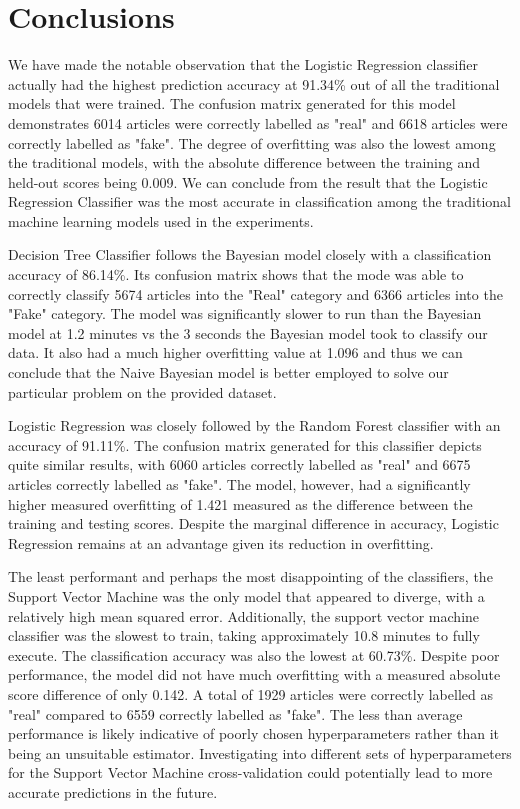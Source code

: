 \documentclass[10pt,twocolumn,letterpaper]{article}
\begin{document}
\section{Conclusions}
\small
We have made the notable observation that the Logistic Regression classifier actually had the highest prediction accuracy at 91.34\% out of all the traditional models that were trained. The confusion matrix generated for this model demonstrates 6014 articles were correctly labelled as "real" and 6618 articles were correctly labelled as "fake". The degree of overfitting was also the lowest among the traditional models, with the absolute difference between the training and held-out scores being 0.009. We can conclude from the result that the Logistic Regression Classifier was the most accurate in classification among the traditional machine learning models used in the experiments. \par

Decision Tree Classifier follows the Bayesian model closely with a classification accuracy of 86.14\%. Its confusion matrix shows that the mode was able to correctly classify 5674 articles into the "Real" category and 6366 articles into the "Fake" category. The model was significantly slower to run than the Bayesian model at 1.2 minutes vs the 3 seconds the Bayesian model took to classify our data. It also had a much higher overfitting value at 1.096 and thus we can conclude that the Naive Bayesian model is better employed to solve our particular problem on the provided dataset.  \par

Logistic Regression was closely followed by the Random Forest classifier with an accuracy of 91.11\%. The confusion matrix generated for this classifier depicts quite similar results, with 6060 articles correctly labelled as "real" and 6675 articles correctly labelled as "fake". The model, however, had a significantly higher measured overfitting of 1.421 measured as the difference between the training and testing scores. Despite the marginal difference in accuracy, Logistic Regression remains at an advantage given its reduction in overfitting. \par

The least performant and perhaps the most disappointing of the classifiers, the Support Vector Machine was the only model that appeared to diverge, with a relatively high mean squared error. Additionally, the support vector machine classifier was the slowest to train, taking approximately 10.8 minutes to fully execute. The classification accuracy was also the lowest at 60.73\%. Despite poor performance, the model did not have much overfitting with a measured absolute score difference of only 0.142. A total of 1929 articles were correctly labelled as "real" compared to 6559 correctly labelled as "fake". The less than average performance is likely indicative of poorly chosen hyperparameters rather than it being an unsuitable estimator. Investigating into different sets of hyperparameters for the Support Vector Machine cross-validation could potentially lead to more accurate predictions in the future.\par
\end{document}
